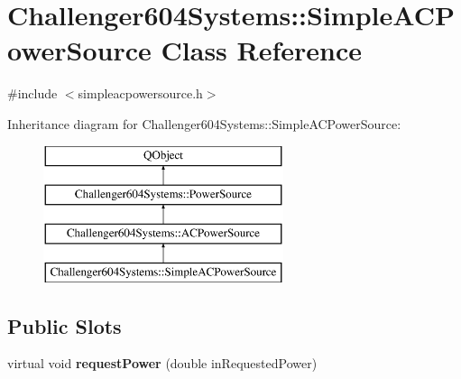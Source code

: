 \hypertarget{class_challenger604_systems_1_1_simple_a_c_power_source}{\section{Challenger604\-Systems\-:\-:Simple\-A\-C\-Power\-Source Class Reference}
\label{class_challenger604_systems_1_1_simple_a_c_power_source}
}


{\ttfamily \#include $<$simpleacpowersource.\-h$>$}

Inheritance diagram for Challenger604\-Systems\-:\-:Simple\-A\-C\-Power\-Source\-:\begin{figure}[H]
\begin{center}
\leavevmode
\includegraphics[height=4.000000cm]{class_challenger604_systems_1_1_simple_a_c_power_source}
\end{center}
\end{figure}
\subsection*{Public Slots}
\begin{DoxyCompactItemize}
\item 
\hypertarget{class_challenger604_systems_1_1_simple_a_c_power_source_a9f35b05f8a01cd0baa2d6de5fc1df083}{virtual void {\bfseries request\-Power} (double in\-Requested\-Power)}\label{class_challenger604_systems_1_1_simple_a_c_power_source_a9f35b05f8a01cd0baa2d6de5fc1df083}

\end{DoxyCompactItemize}
